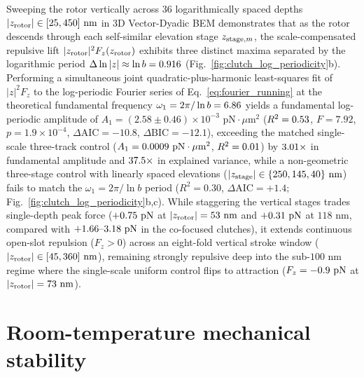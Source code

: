 \documentclass[pdflatex,sn-nature]{sn-jnl}
\DeclareRobustCommand{\roundone}[1]{\fpeval{round(#1,1)}}
\DeclareRobustCommand{\roundtwo}[1]{\fpeval{round(#1,2)}}
\DeclareRobustCommand{\roundthree}[1]{\fpeval{round(#1,3)}}
\DeclareRobustCommand{\roundfour}[1]{\fpeval{round(#1,4)}}
\begin{document}
Sweeping the rotor vertically across $36$ logarithmically spaced depths $|z_{\rm rotor}| \in [25, 450]\text{ nm}$ in 3D Vector-Dyadic BEM demonstrates that as the rotor descends through each self-similar elevation stage $z_{{\rm stage},m}$, the scale-compensated repulsive lift $|z_{\rm rotor}|^2 F_z(z_{\rm rotor})$ exhibits three distinct maxima separated by the logarithmic period $\Delta\ln|z| \approx \ln b = \roundthree{\LogperSteppedRzLnB}$ (Fig.~\ref{fig:clutch_log_periodicity}b). Performing a simultaneous joint quadratic-plus-harmonic least-squares fit of $|z|^2 F_z$ to the log-periodic Fourier series of Eq.~\eqref{eq:fourier_running} at the theoretical fundamental frequency $\omega_1 = 2\pi/\ln b = \roundtwo{\LogperSteppedRzOmegaone}$ yields a fundamental log-periodic amplitude of $A_1 = (2.58 \pm 0.46) \times 10^{-3}\text{ pN}\cdot\mu\text{m}^2$ ($R^2 = \roundtwo{\LogperSteppedRzRtwo}$, $F = 7.92$, $p = 1.9 \times 10^{-4}$, $\Delta\mathrm{AIC} = -10.8$, $\Delta\mathrm{BIC} = -12.1$), exceeding the matched single-scale three-track control ($A_1 = \roundfour{\LogperSteppedRzAmponeUniform}\text{ pN}\cdot\mu\text{m}^2$, $R^2 = \roundtwo{\LogperSteppedRzRtwoUniform}$) by $\roundtwo{\LogperSteppedRzAmponeRatio}\times$ in fundamental amplitude and $\roundone{\LogperSteppedRzRtwoRatio}\times$ in explained variance, while a non-geometric three-stage control with linearly spaced elevations ($|z_{\rm stage}| \in \{250, 145, 40\}\text{ nm}$) fails to match the $\omega_1 = 2\pi/\ln b$ period ($R^2 = 0.30$, $\Delta\mathrm{AIC} = +1.4$; Fig.~\ref{fig:clutch_log_periodicity}b,c). While staggering the vertical stages trades single-depth peak force ($+\roundtwo{\LogperSteppedRzMaxFzCantorPn}\text{ pN}$ at $|z_{\rm rotor}| = 53\text{ nm}$ and $+\roundtwo{\LogperSteppedRzStagetwoFzCantorPn}\text{ pN}$ at $118\text{ nm}$, compared with $+\roundtwo{\CantorNtwoHybridrzBemStdFZPn}\text{--}\roundtwo{\FractalNthreeCantorseventrackBemThetathreeFZPn}\text{ pN}$ in the co-focused clutches), it extends continuous open-slot repulsion ($F_z > 0$) across an eight-fold vertical stroke window ($|z_{\rm rotor}| \in [45, 360]\text{ nm}$), remaining strongly repulsive deep into the sub-$100\text{ nm}$ regime where the single-scale uniform control flips to attraction ($F_z = \roundtwo{\LogperSteppedRzMinFzUniformPn}\text{ pN}$ at $|z_{\rm rotor}| = 73\text{ nm}$).

\section*{Room-temperature mechanical stability}
\label{sec:experimental}
\end{document}
